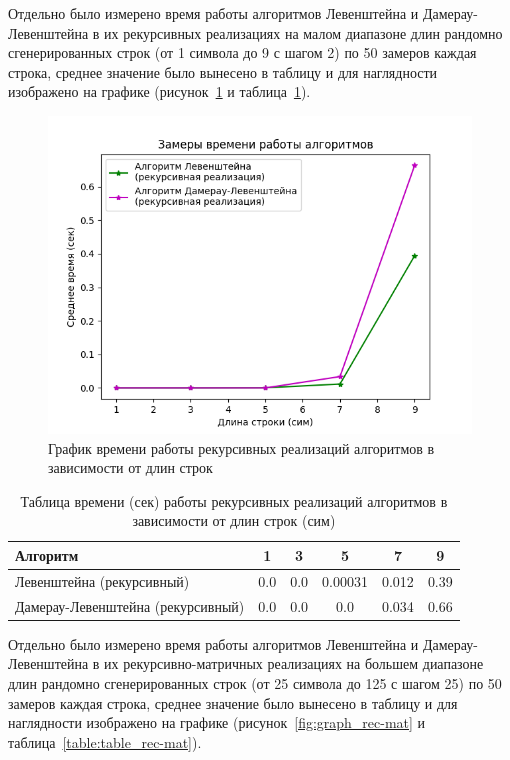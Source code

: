 Отдельно было измерено время работы алгоритмов Левенштейна и Дамерау-Левенштейна в их рекурсивных реализациях на малом диапазоне длин рандомно сгенерированных строк (от 1 символа до 9 с шагом 2) по 50 замеров каждая строка, среднее значение было вынесено в таблицу и для наглядности изображено на графике (рисунок~\ref{fig:graph_rec} и таблица~\ref{table:table_rec}).

\begin{figure}[H]
    \centering
    \includegraphics[width=1\textwidth]{img/graph_rec.png}
    \caption{График времени работы рекурсивных реализаций алгоритмов в зависимости от длин строк}
    \label{fig:graph_rec}
\end{figure}

\begin{table}[H]
    \centering
    \caption{Таблица времени (сек) работы рекурсивных реализаций алгоритмов в зависимости от длин строк (сим)}
    \begin{tabular}{|l|c|c|c|c|c|}
        \hline
        \textbf{Алгоритм} & \textbf{1} & \textbf{3} & \textbf{5} & \textbf{7} & \textbf{9}\\
        \hline
        Левенштейна (рекурсивный) & 0.0 & 0.0 & 0.00031 & 0.012 & 0.39 \\
        Дамерау-Левенштейна (рекурсивный) &  0.0 & 0.0 & 0.0 & 0.034 & 0.66  \\
        \hline
    \end{tabular}
    \label{table:table_rec}
\end{table}

Отдельно было измерено время работы алгоритмов Левенштейна и Дамерау-Левенштейна в их рекурсивно-матричных реализациях на большем диапазоне длин рандомно сгенерированных строк (от 25 символа до 125 с шагом 25) по 50 замеров каждая строка, среднее значение было вынесено в таблицу и для наглядности изображено на графике (рисунок~\ref{fig:graph_rec-mat} и таблица~\ref{table:table_rec-mat}).

